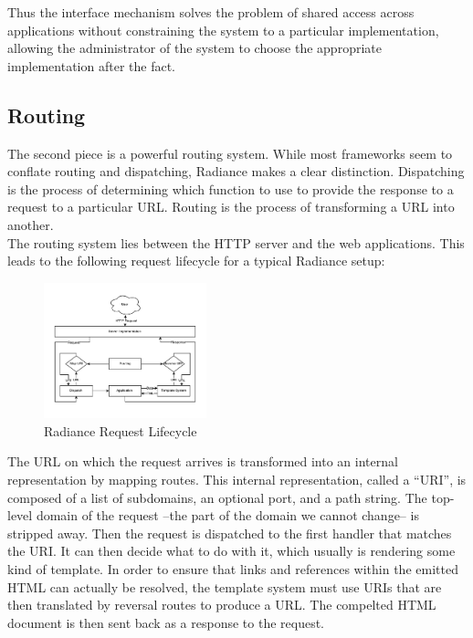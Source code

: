 \documentclass{sig-alternate}
\begin{document}
Thus the interface mechanism solves the problem of shared access across applications without constraining the system to a particular implementation, allowing the administrator of the system to choose the appropriate implementation after the fact. \\

\subsection{Routing}
The second piece is a powerful routing system. While most frameworks seem to conflate routing and dispatching, Radiance makes a clear distinction. Dispatching is the process of determining which function to use to provide the response to a request to a particular URL. Routing is the process of transforming a URL into another. \\

The routing system lies between the HTTP server and the web applications. This leads to the following request lifecycle for a typical Radiance setup: \\

\begin{figure}[H]
  \centering
  \includegraphics[width=0.42\textwidth]{request.pdf}
  \caption{Radiance Request Lifecycle}
\end{figure}

The URL on which the request arrives is transformed into an internal representation by mapping routes. This internal representation, called a ``URI'', is composed of a list of subdomains, an optional port, and a path string. The top-level domain of the request --the part of the domain we cannot change-- is stripped away. Then the request is dispatched to the first handler that matches the URI. It can then decide what to do with it, which usually is rendering some kind of template. In order to ensure that links and references within the emitted HTML can actually be resolved, the template system must use URIs that are then translated by reversal routes to produce a URL. The compelted HTML document is then sent back as a response to the request. \\
\end{document}
